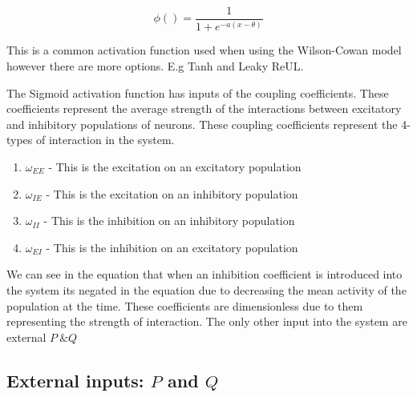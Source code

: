 \documentclass[10pt]{article}
\begin{document}
\begin{equation}
    \phi() = \frac{1}{1+e^{-a(x-\theta)}}
\end{equation}

\begin{flushleft}
    This is a common activation function used when using the Wilson-Cowan model however there are more options. E.g Tanh and Leaky ReUL.
\end{flushleft}

\begin{flushleft}
The Sigmoid activation function has inputs of the coupling coefficients. These coefficients represent the average strength of the interactions between excitatory and inhibitory populations of neurons. These coupling coefficients represent the 4-types of interaction in the system.
\end{flushleft}

\begin{enumerate}
    \item $\omega_{EE}$ - This is the excitation on an excitatory population 
    \item $\omega_{IE}$ - This is the excitation on an inhibitory population 
    \item $\omega_{II}$ - This is the inhibition on an inhibitory population 
    \item $\omega_{EI}$ - This is the inhibition on an excitatory population 
\end{enumerate}

\begin{flushleft}
    We can see in the equation that when an inhibition coefficient is introduced into the system its negated in the equation due to decreasing the mean activity of the population at the time. These coefficients are dimensionless due to them representing the strength of interaction. The only other input into the system are external $P \ \& Q$ 
\end{flushleft}


\subsection{External inputs:  $P$ and $Q$}
\end{document}
